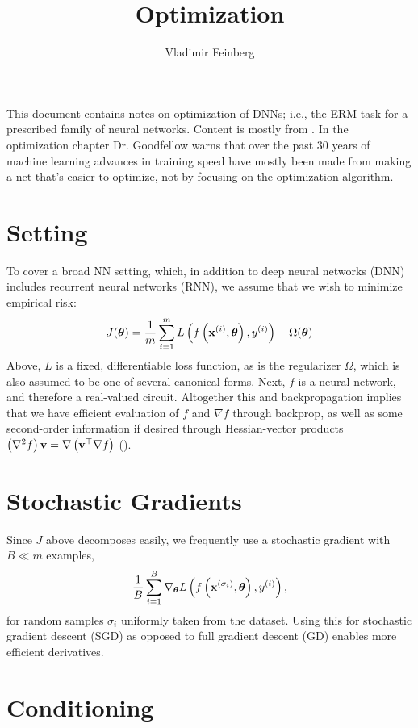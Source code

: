 \documentclass{article}
\title{Optimization}
\author{Vladimir Feinberg}
\begin{document}
\maketitle

This document contains notes on optimization of DNNs; i.e., the ERM task for a prescribed family of neural networks. Content is mostly from . In the optimization chapter Dr. Goodfellow warns that over the past 30 years of machine learning advances in training speed have mostly been made from making a net that's easier to optimize, not by focusing on the optimization algorithm.

\section{Setting}

To cover a broad NN setting, which, in addition to deep neural networks (DNN) includes recurrent neural networks (RNN), we assume that we wish to minimize empirical risk:
$$
J({\boldsymbol\theta})=\frac{1}{m}\sum_{i=1}^mL\left({f\left({\textbf{x}^{(i)}, {\boldsymbol\theta}}\right), y^{(i)}}\right) + \Omega({\boldsymbol\theta})
$$
Above, $L$ is a fixed, differentiable loss function, as is the regularizer $\Omega$, which is also assumed to be one of several canonical forms. Next, $f$ is a neural network, and therefore a real-valued circuit. Altogether this and backpropagation implies that we have efficient evaluation of $f$ and $\nabla f$ through backprop, as well as some second-order information if desired through Hessian-vector products $\left({\nabla^2 f}\right)\textbf{v}=\nabla\left({\textbf{v}^\top\nabla f}\right)$ ().

\section{Stochastic Gradients}

Since $J$ above decomposes easily, we frequently use a stochastic gradient with $B\ll m$ examples,
$$\frac{1}{B}\sum_{i=1}^B\nabla_{\boldsymbol\theta} L\left({f\left({\textbf{x}^{(\sigma_i)}, {\boldsymbol\theta}}\right), y^{(i)}}\right),$$ for random samples $\sigma_i$ uniformly taken from the dataset. Using this for stochastic gradient descent (SGD) as opposed to full gradient descent (GD) enables more efficient derivatives.

\section{Conditioning}
\end{document}
